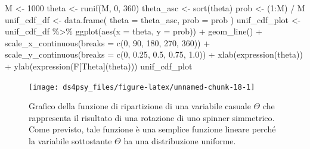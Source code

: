 \documentclass[
  11pt,
]{krantz}
\makeatletter
\newenvironment{Shaded}{\begin{snugshade}}{\end{snugshade}}
\newcommand{\AttributeTok}[1]{\textcolor[rgb]{0.61,0.61,0.61}{#1}}
\newcommand{\DecValTok}[1]{\textcolor[rgb]{0.06,0.06,0.06}{#1}}
\newcommand{\FloatTok}[1]{\textcolor[rgb]{0.06,0.06,0.06}{#1}}
\newcommand{\FunctionTok}[1]{\textcolor[rgb]{0,0,0}{#1}}
\newcommand{\NormalTok}[1]{#1}
\newcommand{\OtherTok}[1]{\textcolor[rgb]{0.37,0.37,0.37}{#1}}
\newcommand{\SpecialCharTok}[1]{\textcolor[rgb]{0,0,0}{#1}}
\newenvironment{kframe}{%
\medskip{}
\setlength{\fboxsep}{.8em}
 \def\at@end@of@kframe{}%
 \ifinner\ifhmode%
  \def\at@end@of@kframe{\end{minipage}}%
  \begin{minipage}{\columnwidth}%
 \fi\fi%
 \def\FrameCommand##1{\hskip\@totalleftmargin \hskip-\fboxsep
 \colorbox{shadecolor}{##1}\hskip-\fboxsep
     \hskip-\linewidth \hskip-\@totalleftmargin \hskip\columnwidth}%
 \MakeFramed {\advance\hsize-\width
   \@totalleftmargin\z@ \linewidth\hsize
   \@setminipage}}%
 {\par\unskip\endMakeFramed%
 \at@end@of@kframe}
\renewenvironment{Shaded}{\begin{kframe}}{\end{kframe}}
\theoremstyle{definition}
\theoremstyle{definition}
\theoremstyle{definition}
\theoremstyle{definition}
\theoremstyle{remark}
\makeatother
\begin{document}
\begin{Shaded}
\begin{Highlighting}[]
\NormalTok{M }\OtherTok{\textless{}{-}} \DecValTok{1000}
\NormalTok{theta }\OtherTok{\textless{}{-}} \FunctionTok{runif}\NormalTok{(M, }\DecValTok{0}\NormalTok{, }\DecValTok{360}\NormalTok{)}
\NormalTok{theta\_asc }\OtherTok{\textless{}{-}} \FunctionTok{sort}\NormalTok{(theta)}
\NormalTok{prob }\OtherTok{\textless{}{-}}\NormalTok{ (}\DecValTok{1}\SpecialCharTok{:}\NormalTok{M) }\SpecialCharTok{/}\NormalTok{ M}
\NormalTok{unif\_cdf\_df }\OtherTok{\textless{}{-}} \FunctionTok{data.frame}\NormalTok{(}
  \AttributeTok{theta =}\NormalTok{ theta\_asc,}
  \AttributeTok{prob =}\NormalTok{ prob}
\NormalTok{)}
\NormalTok{unif\_cdf\_plot }\OtherTok{\textless{}{-}}
\NormalTok{  unif\_cdf\_df }\SpecialCharTok{\%\textgreater{}\%}
  \FunctionTok{ggplot}\NormalTok{(}\FunctionTok{aes}\NormalTok{(}\AttributeTok{x =}\NormalTok{ theta, }\AttributeTok{y =}\NormalTok{ prob)) }\SpecialCharTok{+}
  \FunctionTok{geom\_line}\NormalTok{() }\SpecialCharTok{+}
  \FunctionTok{scale\_x\_continuous}\NormalTok{(}\AttributeTok{breaks =} \FunctionTok{c}\NormalTok{(}\DecValTok{0}\NormalTok{, }\DecValTok{90}\NormalTok{, }\DecValTok{180}\NormalTok{, }\DecValTok{270}\NormalTok{, }\DecValTok{360}\NormalTok{)) }\SpecialCharTok{+}
  \FunctionTok{scale\_y\_continuous}\NormalTok{(}\AttributeTok{breaks =} \FunctionTok{c}\NormalTok{(}\DecValTok{0}\NormalTok{, }\FloatTok{0.25}\NormalTok{, }\FloatTok{0.5}\NormalTok{, }\FloatTok{0.75}\NormalTok{, }\FloatTok{1.0}\NormalTok{)) }\SpecialCharTok{+}
  \FunctionTok{xlab}\NormalTok{(}\FunctionTok{expression}\NormalTok{(theta)) }\SpecialCharTok{+}
  \FunctionTok{ylab}\NormalTok{(}\FunctionTok{expression}\NormalTok{(F[Theta](theta)))}
\NormalTok{unif\_cdf\_plot}
\end{Highlighting}
\end{Shaded}

\begin{figure}[h]

{\centering \texttt{[image: ds4psy\_files/figure-latex/unnamed-chunk-18-1]} 

}

\caption{Grafico della funzione di ripartizione di una variabile casuale $\Theta$ che rappresenta il risultato di una rotazione di uno spinner simmetrico. Come previsto, tale funzione è una semplice funzione lineare perché la variabile sottostante $\Theta$ ha una distribuzione uniforme.}\label{fig:unnamed-chunk-18}
\end{figure}
\end{document}
